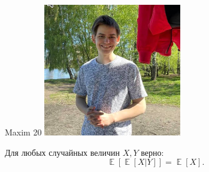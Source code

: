 \documentclass[12pt]{article}
\DeclareMathOperator{\E}{\mathbb{E}}
\begin{document}
\begin{minipage}{0.45\textwidth}
\begin{tinderm}{Maxim 20}
\includegraphics[width=\textwidth]{tinder-photo/maxim.png}

  

\begin{mybox}
Для любых случайных величин $X,Y$ верно: 
\[
\E[\E[X | Y]] = \E[X].
\]
\end{mybox}
\end{tinderm}
\end{minipage}
\end{document}
